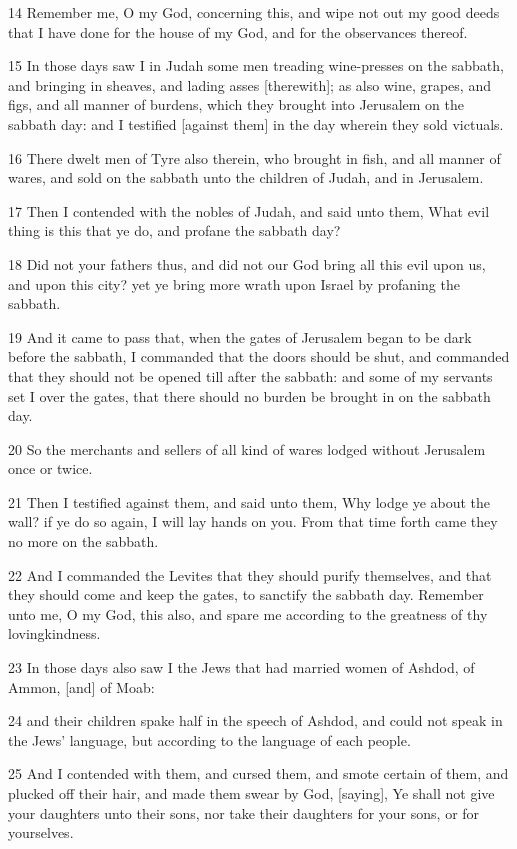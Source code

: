\par 14 Remember me, O my God, concerning this, and wipe not out my good deeds that I have done for the house of my God, and for the observances thereof.
\par 15 In those days saw I in Judah some men treading wine-presses on the sabbath, and bringing in sheaves, and lading asses [therewith]; as also wine, grapes, and figs, and all manner of burdens, which they brought into Jerusalem on the sabbath day: and I testified [against them] in the day wherein they sold victuals.
\par 16 There dwelt men of Tyre also therein, who brought in fish, and all manner of wares, and sold on the sabbath unto the children of Judah, and in Jerusalem.
\par 17 Then I contended with the nobles of Judah, and said unto them, What evil thing is this that ye do, and profane the sabbath day?
\par 18 Did not your fathers thus, and did not our God bring all this evil upon us, and upon this city? yet ye bring more wrath upon Israel by profaning the sabbath.
\par 19 And it came to pass that, when the gates of Jerusalem began to be dark before the sabbath, I commanded that the doors should be shut, and commanded that they should not be opened till after the sabbath: and some of my servants set I over the gates, that there should no burden be brought in on the sabbath day.
\par 20 So the merchants and sellers of all kind of wares lodged without Jerusalem once or twice.
\par 21 Then I testified against them, and said unto them, Why lodge ye about the wall? if ye do so again, I will lay hands on you. From that time forth came they no more on the sabbath.
\par 22 And I commanded the Levites that they should purify themselves, and that they should come and keep the gates, to sanctify the sabbath day. Remember unto me, O my God, this also, and spare me according to the greatness of thy lovingkindness.
\par 23 In those days also saw I the Jews that had married women of Ashdod, of Ammon, [and] of Moab:
\par 24 and their children spake half in the speech of Ashdod, and could not speak in the Jews' language, but according to the language of each people.
\par 25 And I contended with them, and cursed them, and smote certain of them, and plucked off their hair, and made them swear by God, [saying], Ye shall not give your daughters unto their sons, nor take their daughters for your sons, or for yourselves.
